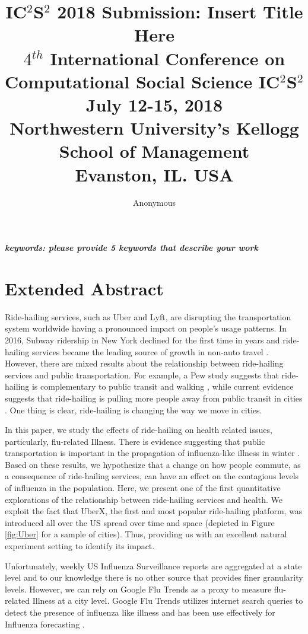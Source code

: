 \documentclass[a4paper,12pt]{article}
\title{IC$^{2}$S$^{2}$ 2018 Submission: Insert Title Here \\
	\normalsize $4$$^{th}$ International Conference on Computational Social Science IC$^{2}$S$^{2}$ \\
	\normalsize July 12-15, 2018 \\
	\normalsize Northwestern University’s Kellogg School of Management \\
	\normalsize Evanston, IL. USA
}
\author[1]{Anonymous} %
\date{}
\begin{document}
\maketitle

\vspace{-2em}

\begin{center}
\textbf{\textit{keywords: please provide 5 keywords that describe your work}}
\newline
\end{center}


\section{Extended Abstract}
Ride-hailing services, such as Uber and Lyft, are disrupting the transportation system worldwide having a pronounced impact on people's usage patterns.  
In 2016, Subway ridership in New York declined for the first time in years and ride-hailing services became the leading source of growth in non-auto travel \cite{schaller2017unsustainable}. However, there are mixed results about the relationship between ride-hailing services and public transportation. For example, a Pew study suggests that ride-hailing is complementary to public transit and walking %
, while current evidence suggests that ride-hailing is pulling more people away from public transit in cities \cite{clewlow2017disruptive}. One thing is clear, ride-hailing is changing the way we move in cities. 

In this paper, we study the effects of ride-hailing on health related issues, particularly, flu-related Illness.
There is evidence suggesting that public transportation is important in the propagation of influenza-like illness in winter \cite{troko2011public,cooley2011role}. Based on these results, we hypothesize that a change on how people commute, as a consequence of ride-hailing services, can have an effect on the contagious levels of influenza in the population.  Here, we present one of the first quantitative explorations of the relationship between ride-hailing services and health. We exploit the fact that UberX, the first and most popular ride-hailing platform, was introduced all over the US spread over time and space (depicted in Figure \ref{fig:Uber} for a sample of cities). Thus, providing us with an excellent natural experiment setting to identify its impact. 

Unfortunately, weekly US Influenza Surveillance reports are aggregated at a state level and to our knowledge there is no other source that provides finer granularity levels. However, we can rely on Google Flu Trends as a proxy to measure flu-related Illness at a city level. Google Flu Trends utilizes internet search queries to detect the presence of influenza like illness and has been use effectively for Influenza forecasting \cite{yang2015accurate,dugas2013influenza}.
\end{document}
